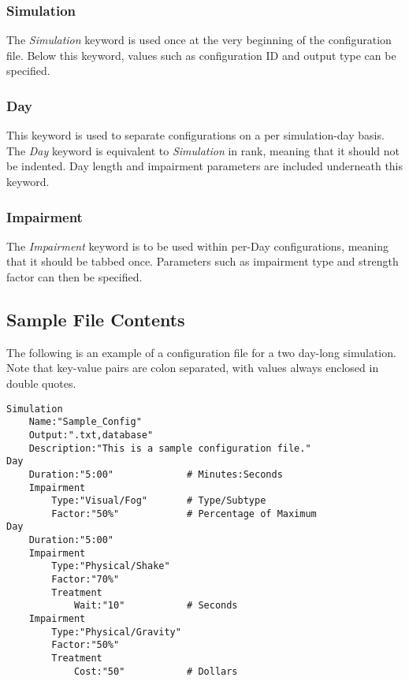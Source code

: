 \documentclass{article}
\begin{document}
\subsubsection*{Simulation}

The \textit{Simulation} keyword is used once at the very beginning of the configuration file. Below this keyword, values such as configuration ID and output type can be specified.

\subsubsection*{Day}

This keyword is used to separate configurations on a per simulation-day basis. The \textit{Day} keyword is equivalent to \textit{Simulation} in rank, meaning that it should not be indented. Day length and impairment parameters are included underneath this keyword.

\subsubsection*{Impairment}

The \textit{Impairment} keyword is to be used within per-Day configurations, meaning that it should be tabbed once. Parameters such as impairment type and strength factor can then be specified. 





\subsection*{Sample File Contents}

The following is an example of a configuration file for a two day-long simulation. Note that key-value pairs are colon separated, with values always enclosed in double quotes. 
\\
\begin{lstlisting}
Simulation
    Name:"Sample_Config"
    Output:".txt,database"
    Description:"This is a sample configuration file."	
Day
    Duration:"5:00"             # Minutes:Seconds
    Impairment
        Type:"Visual/Fog"       # Type/Subtype
        Factor:"50%"            # Percentage of Maximum
Day
    Duration:"5:00"
    Impairment
        Type:"Physical/Shake"
        Factor:"70%"
        Treatment
            Wait:"10"           # Seconds
    Impairment
        Type:"Physical/Gravity"
        Factor:"50%"
        Treatment
            Cost:"50"           # Dollars
\end{lstlisting}



\end{document}
